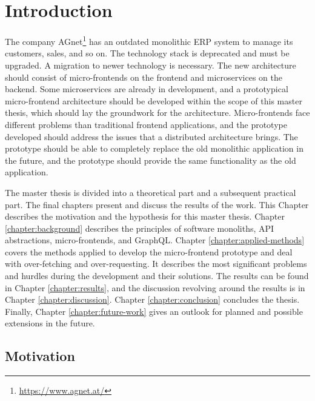 \chapter{Introduction}\label{chapter:introduction}

The company AGnet\footnote{\url{https://www.agnet.at/}} has an outdated monolithic \ac{ERP} system to manage its customers, sales, and so on. The technology stack is deprecated and must be upgraded. A migration to newer technology is necessary. The new architecture should consist of micro-frontends on the frontend and microservices on the backend. Some microservices are already in development, and a prototypical micro-frontend architecture should be developed within the scope of this master thesis, which should lay the groundwork for the architecture. Micro-frontends face different problems than traditional frontend applications, and the prototype developed should address the issues that a distributed architecture brings. The prototype should be able to completely replace the old monolithic application in the future, and the prototype should provide the same functionality as the old application.

\bigskip

\noindent The master thesis is divided into a theoretical part and a subsequent practical part. The final chapters present and discuss the results of the work. This Chapter describes the motivation and the hypothesis for this master thesis. Chapter \ref{chapter:background} describes the principles of software monoliths, \ac{API} abstractions, micro-frontends, and GraphQL. Chapter \ref{chapter:applied-methods} covers the methods applied to develop the micro-frontend prototype and deal with over-fetching and over-requesting. It describes the most significant problems and hurdles during the development and their solutions. The results can be found in Chapter \ref{chapter:results}, and the discussion revolving around the results is in Chapter \ref{chapter:discussion}. Chapter \ref{chapter:conclusion} concludes the thesis. Finally, Chapter \ref{chapter:future-work} gives an outlook for planned and possible extensions in the future.

\section{Motivation}\label{section:introduction:motivation}


